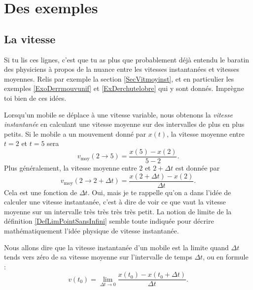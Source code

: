 

					\section{Des exemples}

					\subsection{La vitesse}

Si tu lis ces lignes, c'est que tu as plus que probablement déjà entendu le baratin des physiciens à propos de la nuance entre les vitesses instantanées et vitesses moyennes. Relis par exemple la section \ref{SecVitmoyinst}, et en particulier les exemples \ref{ExoDerrmouvunif} et \ref{ExDerchutelobre} qui y sont donnés. Imprègne toi bien de ces idées.

Lorsqu'un mobile se déplace à une vitesse variable, nous obtenons la \emph{vitesse instantanée} en calculant une vitesse moyenne sur des intervalles de plus en plus petits. Si le mobile a un mouvement donné par $x(t)$, la vitesse moyenne entre $t=2$ et $t=5$ sera
\[ 
  v_{\text{moy}}(2\to 5)=\frac{ x(5)-x(2) }{ 5-2 }.
\]
Plus généralement, la vitesse moyenne entre $2$ et $2+\Delta t$ est donnée par
\[ 
  v_{\text{moy}}(2\to 2+\Delta t)=\frac{ x(2+\Delta t)-x(2) }{ \Delta t }.
\]
Cela est une fonction de $\Delta t$. Oui, mais je te rappelle qu'on a dans l'idée de calculer une vitesse instantanée, c'est à dire de voir ce que vaut la vitesse moyenne sur un intervalle très {\small très} {\footnotesize très} {\scriptsize très} {\tiny petit}. La notion de limite de la définition \ref{DefLimPointSansInfini} semble toute indiquée pour décrire mathématiquement l'idée physique de vitesse instantanée.

Nous allons dire que la vitesse instantanée d'un mobile est la limite quand $\Delta t$ tends vers zéro de sa vitesse moyenne sur l'intervalle de temps $\Delta t$, ou en formule :
\begin{equation}		\label{Eqvinstlimite}
	v(t_0)=\lim_{\Delta t\to 0}\frac{ x(t_0)-x(t_0+\Delta t) }{ \Delta t }.
\end{equation}


